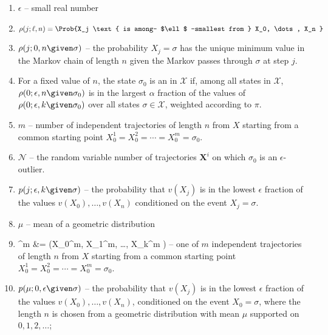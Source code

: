 \documentclass[12pt]{article}
\begin{document}
\begin{enumerate}
    \item
        \( \epsilon \) -- small real number
    \item
        \[
            \rho(j; \ell, n) = \Prob{X_j \text{ is among- $\ell$
            -smallest from } X_0, \dots, X_n }
        \]
    \item
        \( \rho(j; 0, n \given \sigma) \) -- the probability \( X_j =
        \sigma \) has the unique minimum value in the Markov chain of
        length \( n \) given the Markov passes through \( \sigma \) at
        step \( j \).
      \item     For a fixed value of \( n \), the state \( \sigma_0 \) is an  in \( \mathcal{X} \) if, among all
    states in \( \mathcal{X} \), \( \rho(0; \epsilon, n \given \sigma_{0})
    \) is in the largest \( \alpha \) fraction of the values of \( \rho(0;
    \epsilon, k \given \sigma_{0}) \) over all states \( \sigma \in
    \mathcal{X} \), weighted according to \( \pi \).
  \item \( m \) -- number of independent trajectories of length \( n \) from \(
            X \) starting from a common starting point \( X_0^1 =
            X_0^2 = \cdots = X_0^m = \sigma_0 \). 
          \item \( \mathcal{N} \) -- the random variable
            number of trajectories \( \mathbf{X}^i \) on which \( \sigma_0
            \) is an \( \epsilon \)-outlier.
          \item \( p(j; \epsilon,k \given \sigma) \) -- the probability that
\( v(X_j) \) is in the lowest \( \epsilon \) fraction of the values \(
v(X_0), \dots, v(X_n) \) conditioned on the event \( X_j = \sigma
\).
\item $\mu$ -- mean of a geometric distribution
   \item
     ^m &= (X_0^m, X_1^m, \dots, X_k^m ) -- one of
     \( m \) independent trajectories of length \( n \) from \(
            X \) starting from a common starting point \( X_0^1 =
            X_0^2 = \cdots = X_0^m = \sigma_0 \). 
          \item $p(\mu; 0, \epsilon \given \sigma)$
 -- 
the probability that $v(X_j)$ is in the lowest $\epsilon$ fraction of the values
$v(X_0), \dots, v(X_n)$, conditioned on the event  $X_0 = \sigma$, where
the length $n$ is chosen from a geometric distribution with mean $\mu$
supported on $0,1,2,\dots$;
\end{enumerate}
\end{document}
